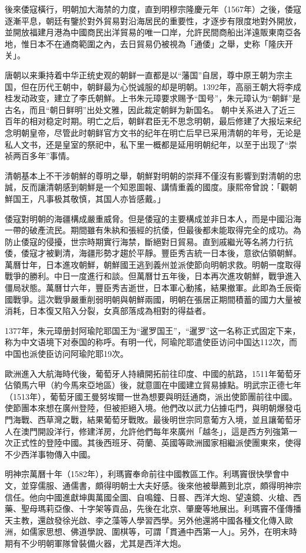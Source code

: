 後來倭寇橫行，明朝加大海禁的力度，直到明穆宗隆慶元年（1567年）之後，倭寇逐漸平息，朝廷有鑒於對外貿易對沿海居民的重要性，才逐步有限度地對外開放，並開放福建月港為中國商民出洋貿易的唯一口岸，允許民間商船出洋遠販東南亞各地，惟日本不在通商範圍之內，去日貿易仍被視為「通倭」之舉，史称「隆庆开关」。

唐朝以来秉持着中华正统史观的朝鲜一直都是以“藩国”自居，尊中原王朝为宗主国，但在历代王朝中，朝鲜最为心悦诚服的却是明朝。1392年，高丽王朝大将李成桂发动政变，建立了李氏朝鮮。上书朱元璋要求赐予“国号”，朱元璋认为“朝鲜”是古名，而且“朝日鲜明”出处文雅，因此裁定朝鲜为新国名。 朝中关系进入了近三百年的相对稳定时期。明亡之后，朝鲜君臣无不思念明朝，最后修建了大报坛来纪念明朝皇帝，尽管此时朝鲜官方文书的纪年在明亡后早已采用清朝的年号，无论是私人文书，还是皇室的祭祀中，私下里一概都是延用明朝纪年，以至于出现了“崇祯两百多年”事情。

清朝基本上不干涉朝鮮的尊明之舉，朝鮮對明朝的崇拜不僅沒有影響到對清朝的忠誠，反而讓清朝感到朝鮮是一个知恩圖報、講情重義的國度。康熙帝曾說：「觀朝鮮国王，凡事极其敬慎，其国人亦皆感戴。」

倭寇對明朝的海疆構成嚴重威脅。但是倭寇的主要構成並非日本人，而是中國沿海一帶的破產流民。期間雖有朱紈和張經的抗倭，但最後都未能取得完全的成功。為防止倭寇的侵擾，世宗時期實行海禁，斷絕對日貿易。直到戚繼光等名將力行抗倭，倭寇才被剿清，海疆形勢才趨於平靜。豐臣秀吉統一日本後，意欲佔領朝鮮。萬曆廿年，日本進攻朝鮮，朝鮮國王逃到義州並派使節向明朝求救。明朝一度取得戰爭的勝利。中日一度進行和談。但萬曆廿五年後，日本再次進攻朝鮮，戰爭進入僵局狀態。萬曆廿六年，豐臣秀吉逝世，日本軍心動搖，結果撤軍。此即為壬辰衛國戰爭。這次戰爭嚴重削弱明朝與朝鮮兩國，明朝在張居正期間積蓄的國力大量被消耗，日本復又陷入分裂，女真部落成為相對的得益者。

1377年，朱元璋册封阿瑜陀耶国王为“暹罗国王”，“暹罗”这一名称正式固定下来，称为中文语境下对泰国的称呼。有明一代，阿瑜陀耶遣使臣访问中国达112次，而中国也派使臣访问阿瑜陀耶19次。

歐洲進入大航海時代後，葡萄牙人持續開拓前往印度、中國的航路，1511年葡萄牙佔領馬六甲（約今馬來亞地區）後，就意圖在中國建立貿易據點。明武宗正德七年（1513年），葡萄牙國王曼努埃爾一世為想要與明廷通商，派出使節團前往中國。使節團本來想在廣州登陸，但被拒絕入境。他們改以武力佔據屯門，與明朝爆發屯門海戰、西草灣之戰，結果葡萄牙戰敗。最後明世宗同意葡方入境，並且讓葡萄牙人在澳門開設洋行，修建洋房，允許他們每年來廣州「越冬」，這是西方列強第一次正式性的登陸中國。其後西班牙、荷蘭、英國等歐洲國家相繼派使團東來，使得不少西洋事物傳入中國。

明神宗萬曆十年（1582年），利瑪竇奉命前往中國教區工作。利瑪竇很快學會中文，並穿儒服、通儒書，頗得明朝士大夫好感。後來他被舉薦到北京，頗得明神宗信任。他向中國進獻坤輿萬國全圖、自鳴鐘、日晷、西洋大炮、望遠鏡、火槍、西藥、聖母瑪莉亞像、十字架等貢品，先後在北京、肇慶等地展出。利瑪竇不僅傳播天主教，還啟發徐光啟、李之藻等人學習西學。另外他還將中國各種文化傳入歐洲，如儒家思想、佛道學說、圍棋等，可謂「貫通中西第一人」。另外，在明末時期有不少明朝軍隊曾裝備火器，尤其是西洋大炮。

